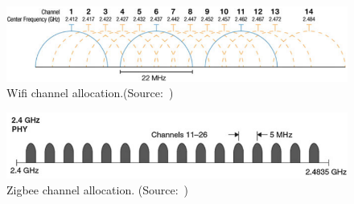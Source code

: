 \documentclass[12pt, oneandhalf, chaparabic, sees, ms]{metu}
\begin{document}
%
%
%
\begin{figure}[!htbp]
 \begin{center}
  \includegraphics[width=\textwidth]{wifi-chan.png}
 \end{center}
 \caption{Wifi channel allocation.(Source:~\protect\cite[p.~21]{shi2017})}
  \label{fig:wifi-chan}
\end{figure}
%
%
\vspace{-0.5cm}
%
%
\begin{figure}[!htbp]
 \begin{center}
  \includegraphics[width=\textwidth]{zigbee-chan.png}
 \end{center}
 \caption{Zigbee channel allocation. (Source:~\protect\cite[p.~12]{shi2017})}
  \label{fig:zigbee-chan}
\end{figure}
%
%
%
%

\newpage
\end{document}
